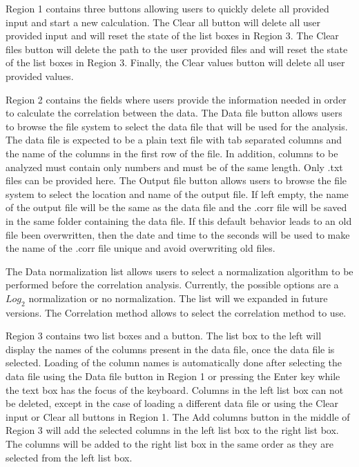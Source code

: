 Region \num{1} contains three buttons allowing users to quickly delete all provided input and start a new calculation. The Clear all button will delete all user provided input and will reset the state of the list boxes in Region \num{3}. The Clear files button will delete the path to the user provided files and will reset the state of the list boxes in Region \num{3}. Finally, the Clear values button will delete all user provided values.

Region \num{2} contains the fields where users provide the information needed in order to calculate the correlation between the data. The Data file button allows users to browse the file system to select the data file that will be used for the analysis. The data file is expected to be a plain text file with tab separated columns and the name of the columns in the first row of the file. In addition, columns to be analyzed must contain only numbers and must be of the same length. Only .txt files can be provided here. The Output file button allows users to browse the file system to select the location and name of the output file. If left empty, the name of the output file will be the same as the data file and the .corr file will be saved in the same folder containing the data file. If this default behavior leads to an old file been overwritten, then the date and time to the seconds will be used to make the name of the .corr file unique and avoid overwriting old files. 

The Data normalization list allows users to select a normalization algorithm to be performed before the correlation analysis. Currently, the possible options are a $Log_{2}$ normalization or no normalization. The list will we expanded in future versions. The Correlation method allows to select the correlation method to use.

Region \num{3} contains two list boxes and a button. The list box to the left will display the names of the columns present in the data file, once the data file is selected. Loading of the column names is automatically done after selecting the data file using the Data file button in Region \num{1} or pressing the Enter key while the text box has the focus of the keyboard. Columns in the left list box can not be deleted, except in the case of loading a different data file or using the Clear input or Clear all buttons in Region \num{1}. The Add columns button in the middle of Region \num{3} will add the selected columns in the left list box to the right list box. The columns will be added to the right list box in the same order as they are selected from the left list box. 

